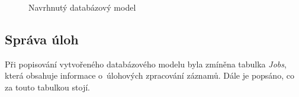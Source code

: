 \documentclass[thesis=M,czech]{FITthesis}[2012/06/26]
\begin{document}
\begin{figure}\centering
	\caption{Navrhnutý databázový model}\label{img:navrh_backend_db}
\end{figure}

\subsection{Správa úloh} \label{subsec:navrh_backend_ulohy}
Při popisování vytvořeného databázového modelu byla zmíněna tabulka \textit{Jobs}, která obsahuje informace o~úlohových zpracování záznamů. Dále je popsáno, co za touto tabulkou stojí.
\end{document}
